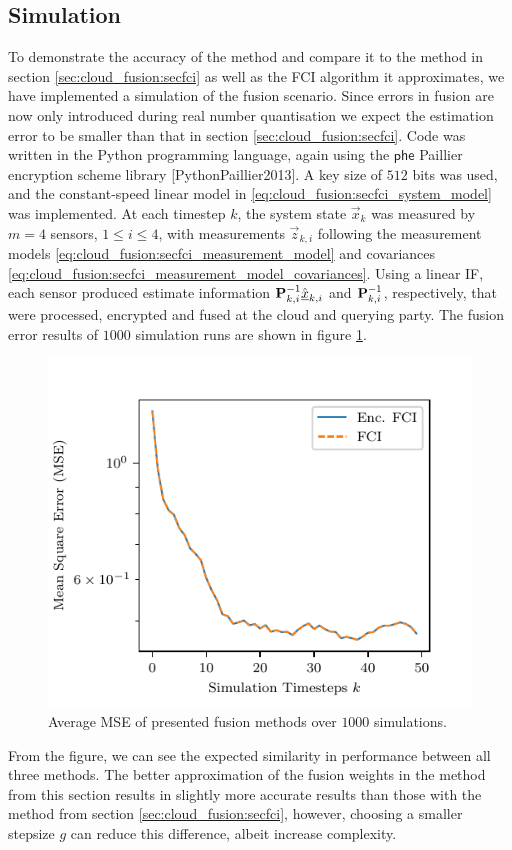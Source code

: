 \subsection{Simulation}\label{subsec:cloud_fusion:secfci2_simulation}
To demonstrate the accuracy of the method and compare it to the method in section \ref{sec:cloud_fusion:secfci} as well as the FCI algorithm it approximates, we have implemented a simulation of the fusion scenario. Since errors in fusion are now only introduced during real number quantisation we expect the estimation error to be smaller than that in section \ref{sec:cloud_fusion:secfci}. Code was written in the Python programming language, again using the $\mathsf{phe}$ Paillier encryption scheme library [PythonPaillier2013]. A key size of $512$ bits was used, and the constant-speed linear model in \eqref{eq:cloud_fusion:secfci_system_model} was implemented. At each timestep $k$, the system state $\vec{x}_k$ was measured by $m=4$ sensors, $1\leq i \leq 4$, with measurements $\vec{z}_{k,i}$ following the measurement models \eqref{eq:cloud_fusion:secfci_measurement_model} and covariances \eqref{eq:cloud_fusion:secfci_measurement_model_covariances}. Using a linear IF, each sensor produced estimate information ${{\mathbf{P}}}_{k, i}^{-1}\hat{{\underline{x}}}_{k, i}$ and ${{\mathbf{P}}}_{k, i}^{-1}$, respectively, that were processed, encrypted and fused at the cloud and querying party. The fusion error results of $1000$ simulation runs are shown in figure \ref{fig:cloud_fusion:secfci2_sim_error}. 
\begin{figure}[htbp]
    \centering
    \includegraphics{figures/sim_error_plot.pdf}
    \caption{Average MSE of presented fusion methods over $1000$ simulations.}
    \label{fig:cloud_fusion:secfci2_sim_error}
\end{figure}
From the figure, we can see the expected similarity in performance between all three methods. The better approximation of the fusion weights in the method from this section results in slightly more accurate results than those with the method from section \ref{sec:cloud_fusion:secfci}, however, choosing a smaller stepsize $g$ can reduce this difference, albeit increase complexity.

